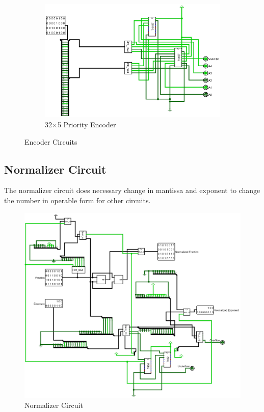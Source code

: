 \documentclass[12pt]{article}
\begin{document}
\begin{figure}[H]
\begin{subfigure}[b]{0.45\textwidth}
        \label{fig:16x4prioenc}
    \end{subfigure}
    \newline
    \newline
    \begin{subfigure}[b]{0.9\textwidth}
        \includegraphics[width=\textwidth]{images/PE_32x5.jpg}
        \caption{32$\times$5 Priority Encoder}
        \label{fig:32x5prioenc}
    \end{subfigure}
    \caption{Encoder Circuits}\label{fig:encoder}
\end{figure}
\newpage
\subsection{Normalizer Circuit}
The normalizer circuit does necessary change in mantissa and exponent to change the number in operable form for other circuits.
\begin{figure}[H]
    \centering
        \includegraphics[width=\textwidth]{images/Normalizer.jpg}
    \caption{ Normalizer Circuit }\label{fig:normalizer}
\end{figure}
\end{document}
